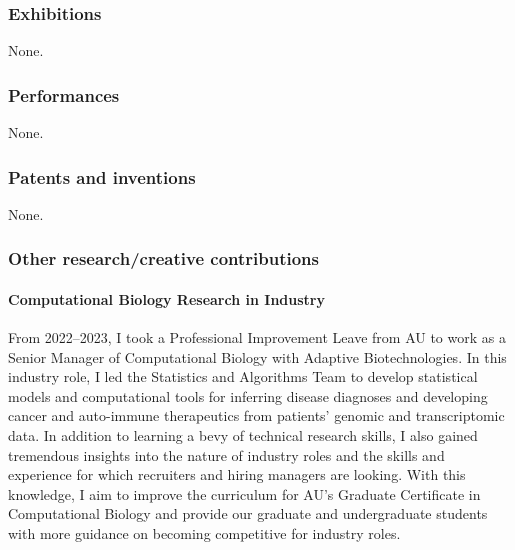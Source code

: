 



\subsubsection{Exhibitions}
None.

\subsubsection{Performances}
None.

\subsubsection{Patents and inventions}
None.

\subsubsection{Other research/creative contributions}

\paragraph{Computational Biology Research in Industry}
From 2022--2023, I took a Professional Improvement Leave from AU
to work as a Senior Manager
of Computational Biology with Adaptive Biotechnologies.
In this industry role, I led the Statistics and Algorithms Team to develop
statistical models and computational tools for inferring disease diagnoses and
developing cancer and auto-immune therapeutics from patients' genomic and
transcriptomic data.
In addition to learning a bevy of technical research skills, I also gained
tremendous insights into the nature of industry roles and the skills and
experience for which recruiters and hiring managers are looking.
With this knowledge, I aim to improve the curriculum for AU's Graduate
Certificate in Computational Biology and provide our graduate and undergraduate
students with more guidance on becoming competitive for industry roles.

